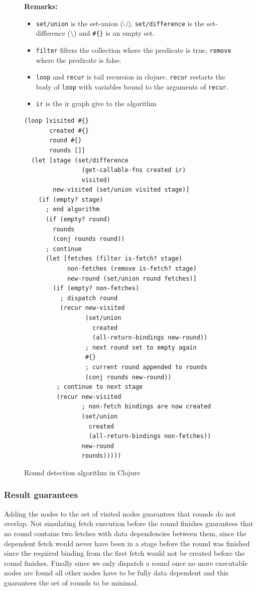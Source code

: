 \begin{figure}
\textbf{Remarks:}
\begin{itemize}
  \item \texttt{set/union} is the set-union ($\cup$), \texttt{set/difference} is the set-difference ($\setminus$) and \texttt{\#\{\}} is an empty set.
  \item \texttt{filter} filters the collection where the predicate is true, \texttt{remove} where the predicate is false.
  \item \texttt{loop} and \texttt{recur} is tail recursion in clojure.
    \texttt{recur} restarts the body of \texttt{loop} with variables bound to the arguments of \texttt{recur}.
  \item \texttt{ir} is the ir graph give to the algorithm
\end{itemize}
\begin{verbatim}
(loop [visited #{}
       created #{}
       round #{}
       rounds []]
  (let [stage (set/difference
                (get-callable-fns created ir)
                visited)
        new-visited (set/union visited stage)]
    (if (empty? stage)
      ; end algorithm
      (if (empty? round)
        rounds
        (conj rounds round))
      ; continue
      (let [fetches (filter is-fetch? stage)
            non-fetches (remove is-fetch? stage)
            new-round (set/union round fetches)]
        (if (empty? non-fetches)
          ; dispatch round
          (recur new-visited
                 (set/union
                   created
                   (all-return-bindings new-round))
                 ; next round set to empty again
                 #{}
                 ; current round appended to rounds
                 (conj rounds new-round))
         ; continue to next stage
         (recur new-visited
                ; non-fetch bindings are now created
                (set/union
                  created
                  (all-return-bindings non-fetches))
                new-round
                rounds)))))
\end{verbatim}
\caption{Round detection algorithm in Clojure}
\label{fig:round-detection}
\end{figure}

\subsubsection{Result guarantees}

Adding the \fetch{} nodes to the set of visited nodes guarantees that rounds do not overlap.
Not simulating fetch execution before the round finishes guarantees that no round contains two fetches with data dependencies between them, since the dependent fetch would never have been in a stage before the round was finished since the required binding from the first fetch would not be created before the round finishes.
Finally since we only dispatch a round once no more executable nodes are found all other nodes have to be fully data dependent and this guarantees the set of rounds to be minimal.

